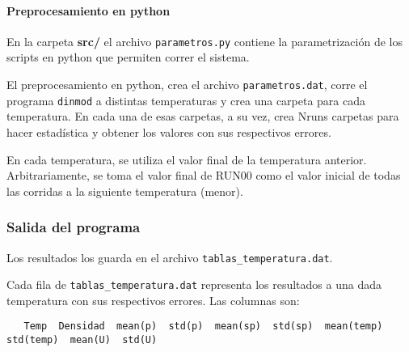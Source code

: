 \paragraph{Preprocesamiento en python}

En la carpeta \textbf{src/} el archivo \texttt{parametros.py} contiene la 
parametrizaci\'on de los scripts en python que permiten correr el sistema.

\begin{comment}
en 
serie (ver \eqref{serie}), 
o en paralelo (ver \eqref{paralelo}).

El preprocesamiento en python, permite definir una zona de c\'alculo de paso
de temperatura fino. Es decir se puede parametrizar un paso de temperatura de
$0.1$ para todo el rango de temperatura y dentro de ese rango definir una zona
donde el paso de temperatura puede ser menor, ej. $\Delta T = 0.02$. Para 
lograr una mejor resoluci\'on
en esa zona.

En particular en este c\'alculo se uso para explorar con m\'as detalle la zona
cr\'itica.

\end{comment}

El preprocesamiento en python, crea el archivo \texttt{parametros.dat}, 
corre el programa \texttt{dinmod} a distintas temperaturas y crea una carpeta para 
 cada temperatura. En cada una de esas carpetas, a su vez, crea Nruns carpetas 
 para hacer estadística y obtener los valores con sus respectivos errores.
 
  En cada temperatura, se utiliza el valor final de la temperatura anterior.
  Arbitrariamente, se toma el valor final de RUN00 como el valor inicial de
  todas las corridas a la siguiente temperatura (menor).
 

\subsubsection{Salida del programa}

Los resultados los guarda en el archivo \texttt{tablas\_temperatura.dat}.

Cada fila de \texttt{tablas\_temperatura.dat} representa los resultados a una 
dada temperatura con sus respectivos errores. Las columnas son:

\begingroup
    \fontsize{9pt}{11pt}\selectfont
\begin{verbatim}
   Temp  Densidad  mean(p)  std(p)  mean(sp)  std(sp)  mean(temp)  std(temp)  mean(U)  std(U)
\end{verbatim}
\endgroup

